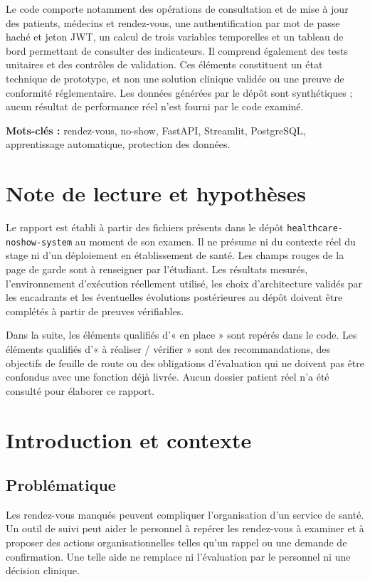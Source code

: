 \documentclass[11pt,a4paper]{report}
\newcommand{\code}[1]{\texttt{#1}}
\begin{document}
Le code comporte notamment des opérations de consultation et de mise à jour des
patients, médecins et rendez-vous, une authentification par mot de passe haché
et jeton JWT, un calcul de trois variables temporelles et un tableau de bord
permettant de consulter des indicateurs. Il comprend également des tests
unitaires et des contrôles de validation. Ces éléments constituent un état
technique de prototype, et non une solution clinique validée ou une preuve de
conformité réglementaire. Les données générées par le dépôt sont synthétiques ;
aucun résultat de performance réel n'est fourni par le code examiné.

\textbf{Mots-clés :} rendez-vous, no-show, FastAPI, Streamlit, PostgreSQL,
apprentissage automatique, protection des données.

\chapter*{Note de lecture et hypothèses}
Le rapport est établi à partir des fichiers présents dans le dépôt
\code{healthcare-noshow-system} au moment de son examen. Il ne présume ni du
contexte réel du stage ni d'un déploiement en établissement de santé. Les champs
rouges de la page de garde sont à renseigner par l'étudiant. Les résultats
mesurés, l'environnement d'exécution réellement utilisé, les choix
d'architecture validés par les encadrants et les éventuelles évolutions
postérieures au dépôt doivent être complétés à partir de preuves vérifiables.

Dans la suite, les éléments qualifiés d'« en place » sont repérés dans le code.
Les éléments qualifiés d'« à réaliser / vérifier » sont des recommandations,
des objectifs de feuille de route ou des obligations d'évaluation qui ne doivent
pas être confondus avec une fonction déjà livrée. Aucun dossier patient réel
n'a été consulté pour élaborer ce rapport.

\tableofcontents
\clearpage
{}

\chapter{Introduction et contexte}
\section{Problématique}
Les rendez-vous manqués peuvent compliquer l'organisation d'un service de
santé. Un outil de suivi peut aider le personnel à repérer les rendez-vous à
examiner et à proposer des actions organisationnelles telles qu'un rappel ou
une demande de confirmation. Une telle aide ne remplace ni l'évaluation par le
personnel ni une décision clinique.
\end{document}
